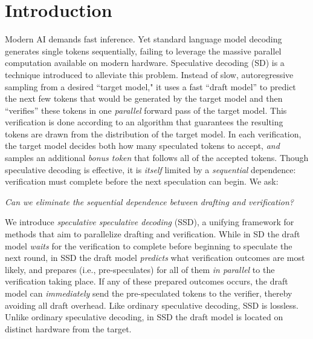 \section{Introduction}


\label{sec:intro}

Modern AI demands fast inference. Yet standard language model decoding generates single tokens sequentially, failing to leverage the massive parallel computation available on modern hardware. Speculative decoding \citep{leviathan2023, chen2023} (SD) is a technique introduced to alleviate this problem. 
Instead of slow, autoregressive sampling from a desired ``target model," it uses a fast ``draft model'' to predict the next few tokens that would be generated by the target model and 
then ``verifies'' these tokens in one \textit{parallel} forward pass of the target model. This verification is done according to an algorithm that guarantees the resulting tokens are drawn from the distribution of the target model.
In each verification, the target model decides both how many speculated tokens to accept, \textit{and} samples an additional \textit{bonus token} that follows all of the accepted tokens.
Though speculative decoding is effective, it is \textit{itself} limited by a \textit{sequential} dependence: verification must complete before the next speculation can begin. We ask: 
\begin{center}
\textit{Can we eliminate the sequential dependence between drafting and verification?}
\end{center}

We introduce \textit{speculative speculative decoding} (SSD), a unifying framework for methods that aim to parallelize drafting and verification.
While in SD the draft model \textit{waits} for the verification to complete before beginning to speculate the next round,
in SSD the draft model \textit{predicts} what verification outcomes are most likely, and prepares (i.e., pre-speculates) for all of them \textit{in parallel} to the verification taking place.
If any of these prepared outcomes occurs, the draft model can \textit{immediately} send the pre-speculated tokens to the verifier, thereby avoiding all draft overhead. 
Like ordinary speculative decoding, SSD is lossless. Unlike ordinary speculative decoding, in SSD the draft model is located on distinct hardware from the target. 

